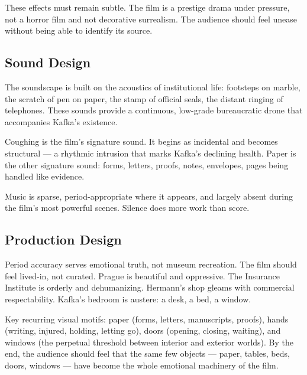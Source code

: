 These effects must remain subtle. The film is a prestige drama under pressure, not a horror film and not decorative surrealism. The audience should feel unease without being able to identify its source.

\subsection{Sound Design}

The soundscape is built on the acoustics of institutional life: footsteps on marble, the scratch of pen on paper, the stamp of official seals, the distant ringing of telephones. These sounds provide a continuous, low-grade bureaucratic drone that accompanies Kafka's existence.

Coughing is the film's signature sound. It begins as incidental and becomes structural --- a rhythmic intrusion that marks Kafka's declining health. Paper is the other signature sound: forms, letters, proofs, notes, envelopes, pages being handled like evidence.

Music is sparse, period-appropriate where it appears, and largely absent during the film's most powerful scenes. Silence does more work than score.

\subsection{Production Design}

Period accuracy serves emotional truth, not museum recreation. The film should feel lived-in, not curated. Prague is beautiful and oppressive. The Insurance Institute is orderly and dehumanizing. Hermann's shop gleams with commercial respectability. Kafka's bedroom is austere: a desk, a bed, a window.

Key recurring visual motifs: paper (forms, letters, manuscripts, proofs), hands (writing, injured, holding, letting go), doors (opening, closing, waiting), and windows (the perpetual threshold between interior and exterior worlds). By the end, the audience should feel that the same few objects --- paper, tables, beds, doors, windows --- have become the whole emotional machinery of the film.

